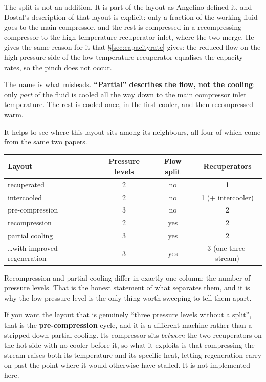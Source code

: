 \documentclass[11pt,a4paper]{report}
\begin{document}
The split is not an addition. It is part of the layout as Angelino defined
it, and Dostal's description of that layout is explicit: only a fraction of
the working fluid goes to the main compressor, and the rest is compressed in
a recompressing compressor to the high-temperature recuperator inlet, where
the two merge. He gives the same reason for it that
\S\ref{sec:capacityrate} gives: the reduced flow on the high-pressure side
of the low-temperature recuperator equalises the capacity rates, so the
pinch does not occur.

The name is what misleads. \textbf{``Partial'' describes the flow, not the
cooling}: only \emph{part} of the fluid is cooled all the way down to the
main compressor inlet temperature. The rest is cooled once, in the first
cooler, and then recompressed warm.

It helps to see where this layout sits among its neighbours, all four of
which come from the same two papers.

\begin{center}
\begin{tabular}{@{}lccc@{}}
\toprule
Layout & Pressure levels & Flow split & Recuperators \\
\midrule
recuperated                  & 2 & no  & 1 \\
intercooled                  & 2 & no  & 1 (+ intercooler) \\
pre-compression              & 3 & no  & 2 \\
recompression                & 2 & yes & 2 \\
partial cooling              & 3 & yes & 2 \\
\;\;\dots with improved regeneration & 3 & yes & 3 (one three-stream) \\
\bottomrule
\end{tabular}
\end{center}

Recompression and partial cooling differ in exactly one column: the number
of pressure levels. That is the honest statement of what separates them, and
it is why the low-pressure level is the only thing worth sweeping to tell
them apart.

If you want the layout that is genuinely ``three pressure levels without a
split'', that is the \textbf{pre-compression} cycle, and it is a different
machine rather than a stripped-down partial cooling. Its compressor sits
\emph{between} the two recuperators on the hot side with no cooler before
it, so what it exploits is that compressing the stream raises both its
temperature and its specific heat, letting regeneration carry on past the
point where it would otherwise have stalled. It is not implemented here.
\end{document}
